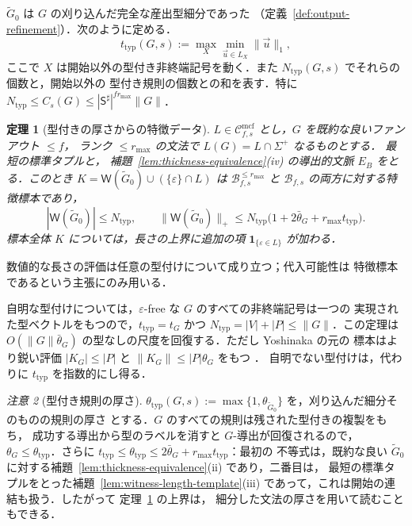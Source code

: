 \documentclass[11pt,a4paper]{ltjsarticle}
\numberwithin{equation}{section}
\theoremstyle{plain}
\newtheorem{theorem}{定理}[section]
\theoremstyle{definition}
\theoremstyle{remark}
\newtheorem{remark}[theorem]{注意}
\newcommand{\Wit}{\mathsf{W}}
\newcommand{\Cmcf}[2]{\mathcal{C}^{\mathrm{mcf}}_{#1,#2}}
\newcommand{\tuple}[1]{\vec{#1}}
\newcommand{\eps}{\varepsilon}
\theoremstyle{plain}
\begin{document}
$\widetilde G_0$ は $G$ の刈り込んだ完全な産出型細分であった
（定義~\ref{def:output-refinement}）．次のように定める．
\[
 t_{\mathrm{typ}}(G,s):=\max_{X}\min_{\tuple u\in L_X}\|\tuple u\|_1,
\]
ここで $X$ は開始以外の型付き非終端記号を動く．また
$N_{\mathrm{typ}}(G,s)$ でそれらの個数と，開始以外の
型付き規則の個数との和を表す．特に $N_{\mathrm{typ}}\le C_s(G)\le
|\mathsf S^\sharp|^{fr_{\max}}\|G\|$．


\begin{theorem}[型付きの厚さからの特徴データ]
\label{thm:data-from-typed-thickness}
$L\in\Cmcf{f}{s}$ とし，$G$ を既約な良いファンアウト $\le f$，
ランク $\le r_{\max}$ の文法で $L(G)=L\cap\Sigma^+$ なるものとする．
最短の標準タプルと，
補題~\ref{lem:thickness-equivalence}(iv) の導出的文脈 $E_B$ をとる．このとき
$K=\Wit(\widetilde G_0)\cup(\{\eps\}\cap L)$ は
$\mathcal B^{\le r_{\max}}_{f,s}$ と $\mathcal B_{f,s}$ の両方に対する特徴標本であり，
\[
 |\Wit(\widetilde G_0)|\le N_{\mathrm{typ}},\qquad
 \|\Wit(\widetilde G_0)\|_+\le
 N_{\mathrm{typ}}\bigl(1+2\bar\theta_G+r_{\max}t_{\mathrm{typ}}\bigr).
\]
標本全体 $K$ については，長さの上界に追加の項
$\mathbf 1_{\{\eps\in L\}}$ が加わる．
\end{theorem}

数値的な長さの評価は任意の型付けについて成り立つ；代入可能性は
特徴標本であるという主張にのみ用いる．


自明な型付けについては，$\eps$-free な $G$ のすべての非終端記号は一つの
実現された型ベクトルをもつので，$t_{\mathrm{typ}}=t_G$ かつ
$N_{\mathrm{typ}}=|V|+|P|\le\|G\|$．この定理は
$O(\|G\|\bar\theta_G)$ の型なしの尺度を回復する．ただし Yoshinaka の元の
標本はより鋭い評価 $|K_G|\le|P|$ と
$\|K_G\|\le|P|\theta_G$ をもつ \cite[Lemma~7 and Theorem~1]{Yoshinaka2011}．
自明でない型付けは，代わりに $t_{\mathrm{typ}}$ を指数的にし得る．

\begin{remark}[型付き規則の厚さ]
\label{lem:typed-thickness-equivalence}
$\theta_{\mathrm{typ}}(G,s):=\max\{1,\theta_{\widetilde G_0}\}$ を，刈り込んだ細分そのものの規則の厚さ
とする．$G$ のすべての規則は残された型付きの複製をもち，
成功する導出から型のラベルを消すと $G$-導出が回復されるので，
$\theta_G\le\theta_{\mathrm{typ}}$．さらに
$t_{\mathrm{typ}}\le\theta_{\mathrm{typ}}\le2\bar\theta_G+r_{\max}t_{\mathrm{typ}}$：最初の
不等式は，既約な良い
$\widetilde G_0$ に対する補題~\ref{lem:thickness-equivalence}(ii) であり，二番目は，
最短の標準タプルをとった補題~\ref{lem:witness-length-template}(iii) であって，これは開始の連結も扱う．したがって
定理~\ref{thm:data-from-typed-thickness} の上界は，
細分した文法の厚さを用いて読むこともできる．
\end{remark}
\end{document}
